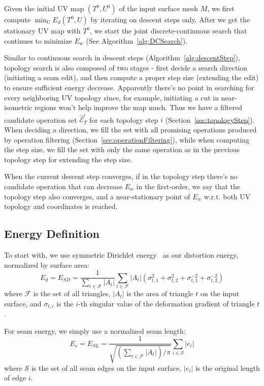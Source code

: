 Given the initial UV map $(T^0, U^0)$ of the input surface mesh $M$, we first compute $\min_U E_d(T^0,U)$ by iterating on descent steps only. After we get the stationary UV map with $T^0$, we start the joint discrete-continuous search that continues to minimize $E_w$ (See Algorithm~\ref{alg:DCSearch}). 

Similar to continuous search in descent steps (Algorithm~\ref{alg:descentStep}), topology search is also composed of two stages - first decide a search direction (initiating a seam edit), and then compute a proper step size (extending the edit) to ensure sufficient energy decrease. Apparently there's no point in searching for every neighboring UV topology since, for example, initiating a cut in near-isometric regions won't help improve the map much. Thus we have a filtered candidate operation set $\hat{\mathcal{E}}^i_T$ for each topology step $i$ (Section~\ref{sec:topologyStep}). When deciding a direction, we fill the set with all promising operations produced by operation filtering (Section~\ref{sec:operationFiltering}), while when computing the step size, we fill the set with only the same operation as in the previous topology step for extending the step size.

When the current descent step converges, if in the topology step there's no candidate operation that can decrease $E_w$ in the first-order, we say that the topology step also converges, and a near-stationary point of $E_w$ w.r.t. both UV topology and coordinates is reached. 

\subsection{Energy Definition}

To start with, we use symmetric Dirichlet energy~\cite{Smith2015Bijective} as our distortion energy, normalized by surface area:
\[ E_d = E_{SD} = \frac{1}{\sum_{t\in\mathcal{F}} |A_t|} \sum_{t\in\mathcal{F}} |A_t|(\sigma_{t,1}^2 + \sigma_{t,2}^2 + \sigma_{t,1}^{-2} + \sigma_{t,2}^{-2}) \]
where $\mathcal{F}$ is the set of all triangles, $|A_t|$ is the area of triangle $t$ on the input surface, and $\sigma_{t,i}$ is the $i$-th singular value of the deformation gradient of triangle $t$.

For seam energy, we simply use a normalized seam length:
\[ E_s = E_{SL} = \frac{1}{\sqrt{(\sum_{t\in\mathcal{F}} |A_t|)/\pi}} \sum_{i \in \mathcal{S}} |e_i| \]
where $\mathcal{S}$ is the set of all seam edges on the input surface, $|e_i|$ is the original length of edge $i$.

